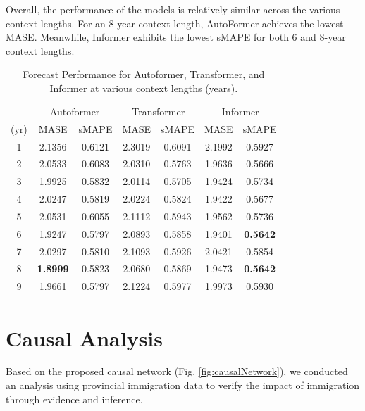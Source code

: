 \documentclass[conference]{IEEEtran}
\begin{document}
	Overall, the performance of the models is relatively similar across the various context lengths. For an 8-year context length, AutoFormer achieves the lowest MASE. Meanwhile, Informer exhibits the lowest sMAPE for both 6 and 8-year context lengths.
	
	\begin{table}[!ht]
		\caption{Forecast Performance for Autoformer, Transformer, and Informer at various context lengths (years).}
		\label{tab:Forecast}
		\begin{center}
			\small
			\begin{tabular}{c|cc|cc|cc}
				& \multicolumn{2}{c|}{Autoformer} & \multicolumn{2}{c|}{Transformer} & \multicolumn{2}{c}{Informer} \\
				
				(yr)  &	MASE	&	sMAPE	&	MASE	&	sMAPE	&	MASE	&	sMAPE	\\
				\hline
				
				1	&	2.1356	&	0.6121	&	2.3019	&	0.6091	&	2.1992	&	0.5927	\\
				2	&	2.0533	&	0.6083	&	2.0310	&	0.5763	&	1.9636	&	0.5666	\\
				3	&	1.9925	&	0.5832	&	2.0114	&	0.5705	&	1.9424	&	0.5734	\\
				4	&	2.0247	&	0.5819	&	2.0224	&	0.5824	&	1.9422	&	0.5677	\\
				5	&	2.0531	&	0.6055	&	2.1112	&	0.5943	&	1.9562	&	0.5736	\\
				6	&	1.9247	&	0.5797	&	2.0893	&	0.5858	&	1.9401	&	\textbf{0.5642}	\\
				7	&	2.0297	&	0.5810	&	2.1093	&	0.5926	&	2.0421	&	0.5854	\\
				8	&	\textbf{1.8999}	&	0.5823	&	2.0680	&	0.5869	&	1.9473	&	\textbf{0.5642}	\\
				9	&	1.9661	&	0.5797	&	2.1224	&	0.5977	&	1.9973	&	0.5930	\\
			\end{tabular}
		\end{center}
	\end{table}
	
	\section{Causal Analysis}
	Based on the proposed causal network (Fig. \ref{fig:causalNetwork}), we conducted an analysis using provincial immigration data to verify the impact of immigration through evidence and inference.
	
\end{document}

